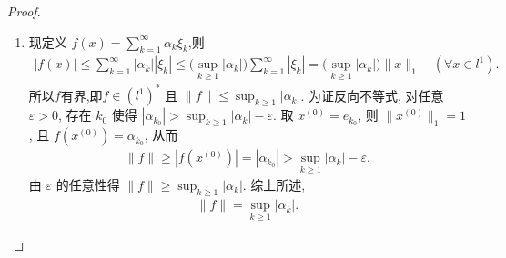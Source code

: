 \documentclass[../../main.tex]{subfiles}%
\begin{document}
\begin{proof}
\begin{enumerate}[(1)]
\item 现定义 $f(x)=\sum_{k=1}^{\infty}\alpha_k\xi_k$,则
\begin{align*}
|f(x)|\leqslant \sum_{k=1}^{\infty}|\alpha_k||\xi_k|
\leqslant \bigl(\sup_{k\geqslant 1}|\alpha_k|\bigr)\sum_{k=1}^{\infty}|\xi_k|
= \bigl(\sup_{k\geqslant 1}|\alpha_k|\bigr)\|x\|_1\quad (\forall x\in l^1).
\end{align*}
所以$f$有界,即$f\in(l^1)^*$ 且 $\|f\|\leqslant \sup_{k\geqslant 1}|\alpha_k|$.
为证反向不等式, 对任意 $\varepsilon>0$, 存在 $k_0$ 使得 $|\alpha_{k_0}| > \sup_{k\geqslant 1}|\alpha_k| - \varepsilon$. 取 $x^{(0)}=e_{k_0}$, 则 $\|x^{(0)}\|_1=1$, 且 $f(x^{(0)})=\alpha_{k_0}$, 从而
\begin{align*}
\|f\|\geqslant |f(x^{(0)})| = |\alpha_{k_0}| > \sup_{k\geqslant 1}|\alpha_k| - \varepsilon.
\end{align*}
由 $\varepsilon$ 的任意性得 $\|f\|\geqslant \sup_{k\geqslant 1}|\alpha_k|$. 综上所述,
\begin{align*}
\|f\| = \sup_{k\geqslant 1}|\alpha_k|.
\end{align*}
\end{enumerate}
\end{proof}
\end{document}
